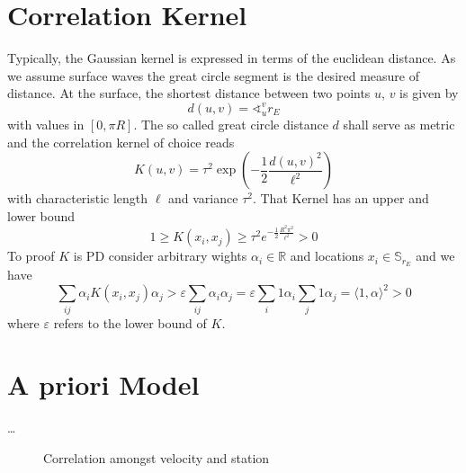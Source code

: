 \documentclass[11pt]{article}
\begin{document}
\section{Correlation Kernel}

Typically, the Gaussian kernel is expressed in terms of the euclidean distance.
As we assume surface waves the great circle segment is the desired measure of distance.
At the surface, the shortest distance between two points $u$, $v$ is given by
\begin{equation}
    d(u,v) = \sphericalangle_u^v r_E
\end{equation}
with values in $[0, \pi R]$.
The so called great circle distance $d$ shall serve as metric and the correlation kernel of choice reads
\begin{equation}
    K(u,v) = \tau^2 \exp\!\left(-\frac 12 \frac{d(u,v)^2}{\ell^2}\right)
\end{equation}
with characteristic length $\ell$ and variance $\tau^2$.
That Kernel has an upper and lower bound
\begin{equation}
    1 \geq K(x_i,x_j) \geq \tau^2 e^{-\frac12\frac{R^2\pi^2}{\ell^2}} > 0
\end{equation}
To proof $K$ is PD consider arbitrary wights $\alpha_i \in \mathbb R$ and locations $x_i \in \mathbb S_{r_E}$ and we have
\begin{equation}
    \sum_{ij} \alpha_i K(x_i, x_j) \alpha_j >
    \varepsilon \sum_{ij} \alpha_i \alpha_j =
    \varepsilon \sum_i 1 \alpha_i \sum_j 1 \alpha_j =
    \langle 1,\alpha \rangle^2 > 0
\end{equation}
where $\varepsilon$ refers to the lower bound of $K$.


\section{A priori Model}
\dots

\begin{figure}
    \centering
    
    \caption{Correlation amongst velocity and station  }
    \label{fig:correlation}
\end{figure}
\end{document}
